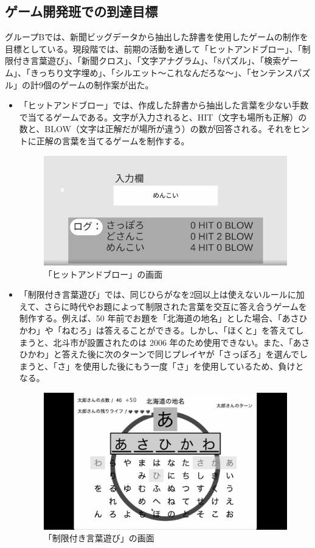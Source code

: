 \subsection{ゲーム開発班での到達目標}
グループBでは、新聞ビッグデータから抽出した辞書を使用したゲームの制作を目標としている。現段階では、前期の活動を通して「ヒットアンドブロー」、「制限付き言葉遊び」、「新聞クロス」、「文字アナグラム」、「8パズル」、「検索ゲーム」、「きっちり文字埋め」、「シルエット～これなんだろな～」、「センテンスパズル」の計9個のゲームの制作案が出た。
\begin{itemize}
    \item 「ヒットアンドブロー」では、作成した辞書から抽出した言葉を少ない手数で当てるゲームである。文字が入力されると、HIT（文字も場所も正解）の数と、BLOW（文字は正解だが場所が違う）の数が回答される。それをヒントに正解の言葉を当てるゲームを制作する。
\begin{figure}[htbp]
    \centering
    \includegraphics[keepaspectratio, scale=0.3]{images/Project_picuture2.png}
    \caption{「ヒットアンドブロー」の画面}
\end{figure}
\newpage
    \item 「制限付き言葉遊び」では、同じひらがなを2回以上は使えないルールに加えて、さらに時代やお題によって制限された言葉を交互に答え合うゲームを制作する。例えば、50 年前でお題を「北海道の地名」とした場合、「あさひかわ」や「ねむろ」は答えることができる。しかし、「ほくと」を答えてしまうと、北斗市が設置されたのは 2006 年のため使用できない。また、「あさひかわ」と答えた後に次のターンで同じプレイヤが「さっぽろ」を選んでしまうと、「さ」を使用した後にもう一度「さ」を使用しているため、負けとなる。
\begin{figure}[htbp]
    \centering
    \includegraphics[keepaspectratio, scale=0.2]{images/Project_picuture1.png}
    \caption{「制限付き言葉遊び」の画面}
\end{figure}


\end{itemize}
